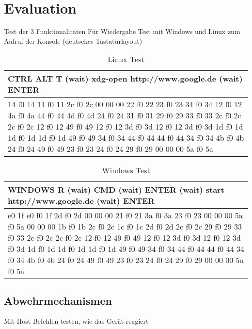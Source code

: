 \chapter{Evaluation}
Test der 3 Funktionalitäten
Für Wiedergabe Test mit Windows und Linux zum Aufruf der Konsole (deutsches Tastaturlayout)

\begin{table}
  \begin{tabularx}{\textwidth}{|X|} \hline
    CTRL ALT T (wait) xdg-open http://www.google.de (wait) ENTER \\ \hline
    14 f0 14 11 f0 11 2c f0 2c 00 00 00 22 f0 22 23 f0 23 34 f0 34 12 f0 12 4a f0 4a 44 f0 44 4d f0 4d 24 f0 24 31 f0 31 29 f0 29 33 f0 33 2c f0 2c 2c f0 2c 12 f0 12 49 f0 49 12 f0 12 3d f0 3d 12 f0 12 3d f0 3d 1d f0 1d 1d f0 1d 1d f0 1d 49 f0 49 34 f0 34 44 f0 44 44 f0 44 34 f0 34 4b f0 4b 24 f0 24 49 f0 49 23 f0 23 24 f0 24 29 f0 29 00 00 00 5a f0 5a \\ \hline
  \end{tabularx}
  \caption{Linux Test}
  \label{linux_test}
\end{table}


\begin{table}
  \begin{tabularx}{\textwidth}{|X|} \hline
    WINDOWS R (wait) CMD (wait) ENTER (wait) start http://www.google.de (wait) ENTER \\ \hline
    e0 1f e0 f0 1f 2d f0 2d 00 00 00 21 f0 21 3a f0 3a 23 f0 23 00 00 00 5a f0 5a 00 00 00 1b f0 1b 2c f0 2c 1c f0 1c 2d f0 2d 2c f0 2c 29 f0 29 33 f0 33 2c f0 2c 2c f0 2c 12 f0 12 49 f0 49 12 f0 12 3d f0 3d 12 f0 12 3d f0 3d 1d f0 1d 1d f0 1d 1d f0 1d 49 f0 49 34 f0 34 44 f0 44 44 f0 44 34 f0 34 4b f0 4b 24 f0 24 49 f0 49 23 f0 23 24 f0 24 29 f0 29 00 00 00 5a f0 5a \\ \hline
  \end{tabularx}
  \caption{Windows Test}
  \label{windows_test}
\end{table}




\section{Abwehrmechanismen}
Mit Host Befehlen testen, wie das Gerät reagiert \cite{mihailowitsch}